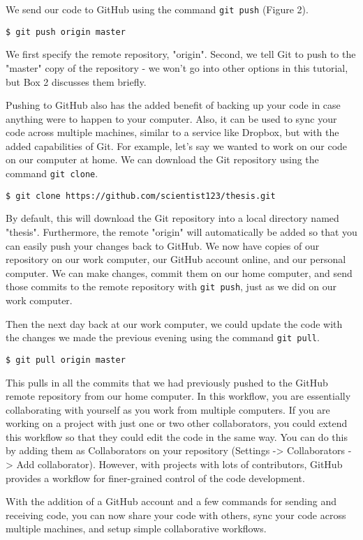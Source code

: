 We send our code to GitHub using the command \verb|git push| (Figure 2).

\begin{lstlisting}
$ git push origin master
\end{lstlisting}

We first specify the remote repository, "origin".
Second, we tell Git to push to the "master" copy of the repository - we won’t go into other options in this tutorial, but Box 2 discusses them briefly.

Pushing to GitHub also has the added benefit of backing up your code in case anything were to happen to your computer.
Also, it can be used to sync your code across multiple machines, similar to a service like Dropbox, but with the added capabilities of Git.
For example, let's say we wanted to work on our code on our computer at home.
We can download the Git repository using the command \verb|git clone|.

\begin{lstlisting}
$ git clone https://github.com/scientist123/thesis.git
\end{lstlisting}

By default, this will download the Git repository into a local directory named "thesis".
Furthermore, the remote "origin" will automatically be added so that you can easily push your changes back to GitHub.
We now have copies of our repository on our work computer, our GitHub account online, and our personal computer.
We can make changes, commit them on our home computer, and send those commits to the remote repository with \verb|git push|, just as we did on our work computer.

Then the next day back at our work computer, we could update the code with the changes we made the previous evening using the command \verb|git pull|.

\begin{lstlisting}
$ git pull origin master
\end{lstlisting}

This pulls in all the commits that we had previously pushed to the GitHub remote repository from our home computer.
In this workflow, you are essentially collaborating with yourself as you work from multiple computers.
If you are working on a project with just one or two other collaborators, you could extend this workflow so that they could edit the code in the same way.
You can do this by adding them as Collaborators on your repository (Settings -> Collaborators -> Add collaborator).
However, with projects with lots of contributors, GitHub provides a workflow for finer-grained control of the code development.

With the addition of a GitHub account and a few commands for sending and receiving code, you can now share your code with others, sync your code across multiple machines, and setup simple collaborative workflows.